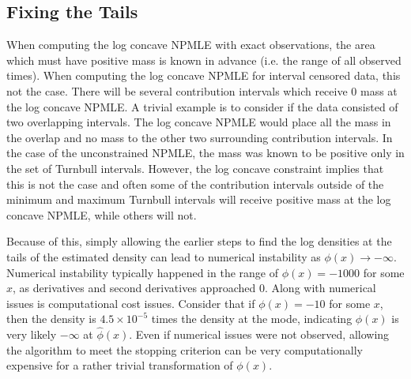 \documentclass[12pt]{article}
\numberwithin{equation}{section}
\begin{document}
		{\subsection{Fixing the Tails} }
	
	When computing the log concave NPMLE with exact observations, the area which must have positive mass is known in advance (i.e. the range of all observed times). When computing the log concave NPMLE for interval censored data, this not the case. There will be several contribution intervals which receive 0 mass at the log concave NPMLE. A trivial example is to consider if the data consisted of two overlapping intervals. The log concave NPMLE would place all the mass in the overlap and no mass to the other two surrounding contribution intervals. In the case of the unconstrained NPMLE, the mass was known to be positive only in the set of Turnbull intervals. However, the log concave constraint implies that this is not the case and often some of the contribution intervals outside of the minimum and maximum Turnbull intervals will receive positive mass at the log concave NPMLE, while others will not.
	 		
	Because of this, simply allowing the earlier steps to find the log densities	 at the tails of the estimated density can lead to numerical instability as $\phi(x) \rightarrow -\infty$. Numerical instability typically happened in the range of $\phi(x) = -1000$ for some $x$, as derivatives and second derivatives approached 0. Along with numerical issues is computational cost issues. Consider that if $\phi(x) = -10$ for some $x$, then the density is $4.5 \times 10^{-5}$ times the density at the mode, indicating $\phi(x)$ is very likely $-\infty$ at $\hat \phi(x)$. Even if numerical issues were not observed, allowing the algorithm to meet the stopping criterion can be very computationally expensive for a rather trivial transformation of $\phi(x)$. 
	
\end{document}
